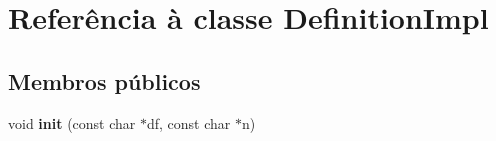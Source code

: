 \hypertarget{class_definition_impl}{\section{Referência à classe Definition\-Impl}
\label{class_definition_impl}
}
\subsection*{Membros públicos}
\begin{DoxyCompactItemize}
\item 
\hypertarget{class_definition_impl_a3f3d6d6e976bb0f343febef3c6341172}{void {\bfseries init} (const char $\ast$df, const char $\ast$n)}\label{class_definition_impl_a3f3d6d6e976bb0f343febef3c6341172}

\end{DoxyCompactItemize}
